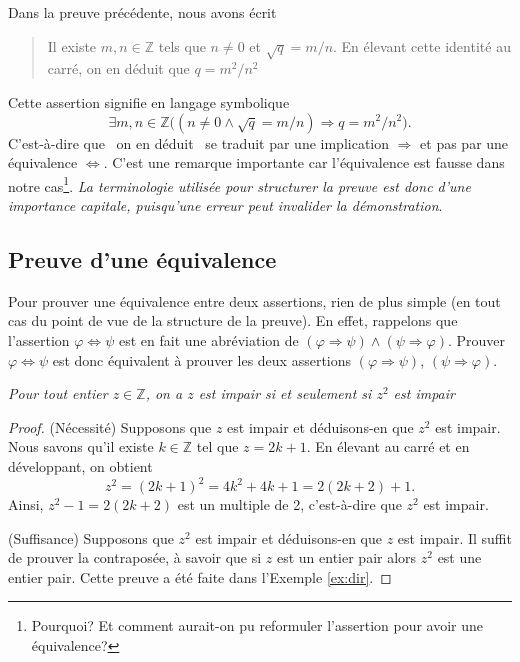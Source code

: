 \documentclass[french,course,oneside,theoremnosection]{lecture}
\newcommand{\Z}{\mathbb{Z}}
\newcommand{\iimplies}{\Rightarrow}
\newcommand{\ifff}{\Leftrightarrow}
\begin{document}
\begin{remark}
Dans la preuve précédente, nous avons écrit
\begin{quotation}
Il existe $m,n \in \Z$ tels que $n\neq 0$ et $\sqrt{q}={m}/{n}$. En élevant cette identité au carré, on en déduit que $q={m^2}/{n^2}$
\end{quotation}
Cette assertion signifie en langage symbolique
\[
\exists m,n \in \Z \big((n\neq 0\wedge \sqrt{q}={m}/{n})\iimplies q={m^2}/{n^2}\big).
\]
C'est-à-dire que \og~on en déduit~\fg{} se traduit par une implication $\iimplies$ et pas par une équivalence $\Leftrightarrow$. C'est une remarque importante car l'équivalence est fausse dans notre cas\footnote{Pourquoi? Et comment aurait-on pu reformuler l'assertion pour avoir une équivalence?}. \emph{La terminologie utilisée pour structurer la preuve est donc d'une importance capitale, puisqu'une erreur peut invalider la démonstration}. 
\end{remark}

\subsection{Preuve d'une équivalence}

Pour prouver une équivalence entre deux assertions, rien de plus simple (en tout cas du point de vue de la structure de la preuve). En effet, rappelons que l'assertion $\varphi \ifff \psi$ est en fait une abréviation de $(\varphi \iimplies \psi) \wedge (\psi \iimplies \varphi)$. Prouver $\varphi \ifff \psi$ est donc équivalent  à prouver les deux assertions  $(\varphi \iimplies \psi)$, $(\psi \iimplies \varphi)$.

\begin{example}
\emph{Pour tout entier $z\in \Z$, on a $z$ est impair si et seulement si $z^2$ est impair}
\end{example}
\begin{proof}
(Nécessité) Supposons que $z$ est impair et déduisons-en que $z^2$ est impair. Nous savons qu'il existe $k\in \Z$ tel que $z=2k+1$. En élevant au carré et en développant, on obtient 
\[
z^2=(2k+1)^2=4k^2+4k+1=2(2k+2)+1.
\]
Ainsi, $z^2-1=2(2k+2)$ est un multiple de 2, c'est-à-dire que $z^2$ est impair.

(Suffisance) Supposons que $z^2$ est impair et déduisons-en que $z$ est impair. Il suffit de prouver la contraposée, à savoir que si $z$  est un entier pair alors $z^2$ est une entier pair. Cette preuve a été faite dans l'Exemple \ref{ex:dir}.
\end{proof}
\end{document}
